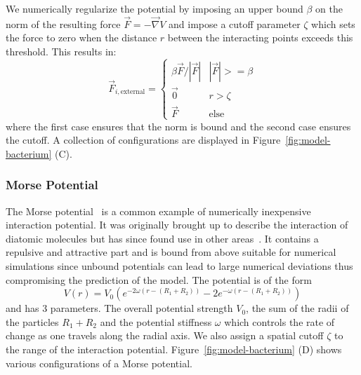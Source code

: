 We numerically regularize the potential by imposing an upper bound $\beta$ on the norm of the
resulting force $\vec{F} = -\vec{\nabla} V$ and impose a cutoff parameter $\zeta$ which sets the
force to zero when the distance $r$ between the interacting points exceeds this threshold.
This results in:
\begin{equation}
    \vec{F}_{i,\text{external}} = \left\{
    \begin{array}{ll}
        \beta\vec{F}/|\vec{F}| & |\vec{F}| >= \beta\\
        \vec{0} & r > \zeta\\
        \vec{F} & \text{else}
    \end{array}\right.
\end{equation}
where the first case ensures that the norm is bound and the second case ensures the cutoff.
A collection of configurations are displayed in Figure~\ref{fig:model-bacterium} (C).

\subsubsection{Morse Potential}
\label{subsec:morse-potential}

The Morse potential~\cite{Morse1929} is a common example of numerically inexpensive interaction
potential.
It was originally brought up to describe the interaction of diatomic molecules but has since found
use in other areas~\cite{Breitwieser2021}.
It contains a repulsive and attractive part and is bound from above
suitable for numerical simulations since unbound potentials can lead to large numerical deviations
thus compromising the prediction of the model.
The potential is of the form
\begin{equation}
    V(r) = V_0\left(e^{-2\omega(r-(R_1+R_2))} - 2e^{-\omega(r-(R_1+R_2))}\right)
\end{equation}
and has 3 parameters.
The overall potential strength $V_0$, the sum of the radii of the particles $R_1+R_2$ and the
potential stiffness $\omega$ which controls the rate of change as one travels along the radial axis.
We also assign a spatial cutoff $\zeta$ to the range of the interaction potential.
Figure~\ref{fig:model-bacterium} (D) shows various configurations of a Morse potential.

